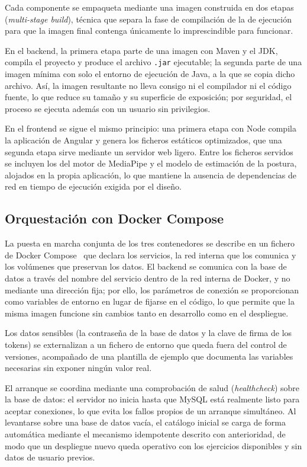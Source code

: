 \documentclass[12pt,a4paper,twoside,openright]{book}
\begin{document}
    Cada componente se empaqueta mediante una imagen construida en dos etapas
    (\textit{multi-stage build}), técnica que separa la fase de compilación de
    la de ejecución para que la imagen final contenga únicamente lo
    imprescindible para funcionar.

    En el backend, la primera etapa parte de una imagen con Maven y el JDK,
    compila el proyecto y produce el archivo \texttt{.jar} ejecutable; la
    segunda parte de una imagen mínima con solo el entorno de ejecución de Java,
    a la que se copia dicho archivo. Así, la imagen resultante no lleva consigo ni el
    compilador ni el código fuente, lo que reduce su tamaño y su superficie de
    exposición; por seguridad, el proceso se ejecuta además con un usuario sin
    privilegios.

    En el frontend se sigue el mismo principio: una primera etapa con Node
    compila la aplicación de Angular y genera los ficheros estáticos
    optimizados, que una segunda etapa sirve mediante un servidor web ligero.
    Entre los ficheros servidos se incluyen los del motor de MediaPipe y el
    modelo de estimación de la postura, alojados en la propia aplicación, lo que
    mantiene la ausencia de dependencias de red en tiempo de ejecución exigida
    por el diseño.

    \subsection{Orquestación con Docker Compose}

    La puesta en marcha conjunta de los tres contenedores se describe en un
    fichero de Docker Compose~\cite{dockercompose} que declara los servicios, la red interna que los
    comunica y los volúmenes que preservan los datos. El backend se comunica con
    la base de datos a través del nombre del servicio dentro de la red interna
    de Docker, y no mediante una dirección fija; por ello, los parámetros de
    conexión se proporcionan como variables de entorno en lugar de fijarse en el
    código, lo que permite que la misma imagen funcione sin cambios tanto en
    desarrollo como en el despliegue.

    Los datos sensibles (la contraseña de la base de datos y la clave de firma de los tokens)
    se externalizan a un fichero de entorno que queda fuera del
    control de versiones, acompañado de una plantilla de ejemplo que documenta
    las variables necesarias sin exponer ningún valor real.

    El arranque se coordina mediante una comprobación de salud
    (\textit{healthcheck}) sobre la base de datos: el servidor no inicia hasta
    que MySQL está realmente listo para aceptar conexiones, lo que evita los
    fallos propios de un arranque simultáneo. Al levantarse sobre una base de
    datos vacía, el catálogo inicial se carga de forma automática mediante el
    mecanismo idempotente descrito con anterioridad, de modo que un despliegue
    nuevo queda operativo con los ejercicios disponibles y sin datos de usuario
    previos.
\end{document}
